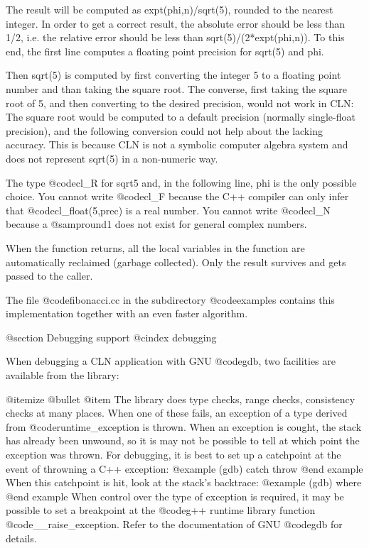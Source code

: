 The result will be computed as expt(phi,n)/sqrt(5), rounded to the nearest
integer. In order to get a correct result, the absolute error should be less
than 1/2, i.e. the relative error should be less than sqrt(5)/(2*expt(phi,n)).
To this end, the first line computes a floating point precision for sqrt(5)
and phi.

Then sqrt(5) is computed by first converting the integer 5 to a floating point
number and than taking the square root. The converse, first taking the square
root of 5, and then converting to the desired precision, would not work in
CLN: The square root would be computed to a default precision (normally
single-float precision), and the following conversion could not help about
the lacking accuracy. This is because CLN is not a symbolic computer algebra
system and does not represent sqrt(5) in a non-numeric way.

The type @code{cl_R} for sqrt5 and, in the following line, phi is the only
possible choice. You cannot write @code{cl_F} because the C++ compiler can
only infer that @code{cl_float(5,prec)} is a real number. You cannot write
@code{cl_N} because a @samp{round1} does not exist for general complex
numbers.

When the function returns, all the local variables in the function are
automatically reclaimed (garbage collected). Only the result survives and
gets passed to the caller.

The file @code{fibonacci.cc} in the subdirectory @code{examples}
contains this implementation together with an even faster algorithm.

@section Debugging support
@cindex debugging

When debugging a CLN application with GNU @code{gdb}, two facilities are
available from the library:

@itemize @bullet
@item The library does type checks, range checks, consistency checks at
many places. When one of these fails, an exception of a type derived from
@code{runtime_exception} is thrown. When an exception is cought, the stack
has already been unwound, so it is may not be possible to tell at which
point the exception was thrown. For debugging, it is best to set up a
catchpoint at the event of throwning a C++ exception:
@example
(gdb) catch throw
@end example
When this catchpoint is hit, look at the stack's backtrace:
@example
(gdb) where
@end example
When control over the type of exception is required, it may be possible
to set a breakpoint at the @code{g++} runtime library function
@code{__raise_exception}. Refer to the documentation of GNU @code{gdb}
for details.

